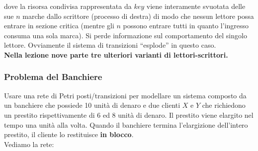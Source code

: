 \documentclass[a4paper,12pt, oneside]{book}
\begin{document}
\begin{center}
\end{center}
dove la risorsa condivisa rappresentata da $key$ viene interamente svuotata
delle sue $n$ marche dallo scrittore (processo di destra) di modo che nessun
lettore possa entrare in sezione critica (mentre gli $n$ possono entrare tutti
in quanto l'ingresso consuma una sola marca). Si perde informazione sul
comportamento del singolo lettore. Ovviamente il sistema di transizioni
``esplode'' in questo caso.\\
\textbf{Nella lezione nove parte tre ulteriori varianti di lettori-scrittori.}
\subsubsection{Problema del Banchiere}
Usare una rete di Petri posti/transizioni per modellare un sistema composto da
un banchiere che possiede 10 unità di denaro e due clienti $X$ e $Y$ che
richiedono un prestito rispettivamente di 6 ed 8 unità di denaro. Il prestito
viene elargito nel tempo una unità alla volta. Quando il banchiere termina
l’elargizione dell’intero prestito, il cliente lo restituisce \textbf{in
  blocco}. \\
Vediamo la rete:
\end{document}
